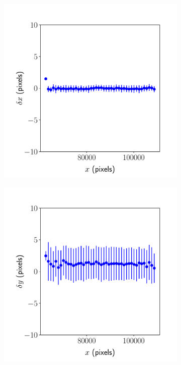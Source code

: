 \documentclass{article}
\begin{document}
\begin{figure}[ht]
\begin{subfigure}{0.24\linewidth}
		\caption{}
		\label{fig:sinewave4yy1}
	\end{subfigure}
	\begin{subfigure}{0.24\linewidth}
		\includegraphics[width=\linewidth]{sine-wave-2-xx-2.pdf}
		\caption{}
		\label{fig:sinewave2xx2}
	\end{subfigure}
	\begin{subfigure}{0.24\linewidth}
		\includegraphics[width=\linewidth]{sine-wave-2-yx-2.pdf}

\end{subfigure}
\end{figure}
\end{document}

